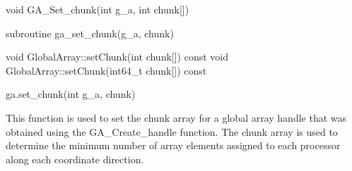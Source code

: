 \documentclass[10pt]{article}
\begin{document}

\begin{capi}
\begin{ccode}
void GA_Set_chunk(int g_a, int chunk[])
\end{ccode}
\begin{funcargs}
\end{funcargs}
\end{capi}

\begin{fapi}
\begin{fcode}
subroutine ga_set_chunk(g_a, chunk)
\end{fcode}
\begin{funcargs}
\end{funcargs}
\end{fapi}

\begin{cxxapi}
\begin{cxxcode}
void GlobalArray::setChunk(int chunk[]) const
void GlobalArray::setChunk(int64_t chunk[]) const
\end{cxxcode}
\begin{funcargs}
\end{funcargs}
\end{cxxapi}

\begin{pyapi}
\begin{pycode}
ga.set_chunk(int g_a, chunk)
\end{pycode}
\begin{funcargs}
\end{funcargs}
\end{pyapi}

\gcoll

\begin{desc}

This function is used to set the chunk array for a global array handle that was
obtained using the GA_Create_handle function. The chunk array is used to
determine the minimum number of array elements assigned to each processor along
each coordinate direction.

\end{desc}

\end{document}
